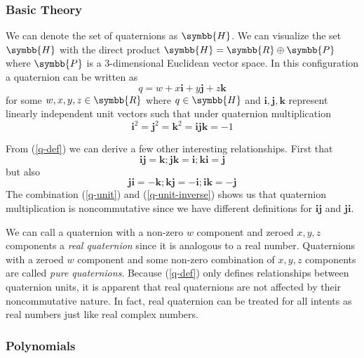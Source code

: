 \documentclass[11pt,hidelinks]{article}
\numberwithin{equation}{section} %
\theoremstyle{bf}
\theoremstyle{indentbf}
\begin{document}
\subsubsection{Basic Theory}
\label{sec:org50cc40b}

We can denote the set of quaternions as \(\symbb{H}\). We can visualize the set \(\symbb{H}\) with the direct product \(\symbb{H} = \symbb{R} \oplus \symbb{P}\) where \(\symbb{P}\) is a 3-dimensional Euclidean vector space. In this configuration a quaternion can be written as
\begin{equation}
    q = w + x\symbf{i} + y\symbf{j} + z\symbf{k}
\end{equation}
for some \(w,x,y,z \in \symbb{R}\) where \(q \in \symbb{H}\) and \(\symbf{i},\symbf{j},\symbf{k}\) represent linearly independent unit vectors such that under quaternion multiplication
\begin{equation}
\label{q-def}
    \symbf{i}^2 = \symbf{j}^2 = \symbf{k}^2 = \symbf{ijk} = -1
\end{equation}

From (\ref{q-def}) we can derive a few other interesting relationships. First that
\begin{equation}
\label{q-unit}
    \symbf{ij} = \symbf{k}; \symbf{jk} = \symbf{i}; \symbf{ki} = \symbf{j}
\end{equation}
but also
\begin{equation}
\label{q-unit-inverse}
    \symbf{ji} = -\symbf{k}; \symbf{kj} = -\symbf{i}; \symbf{ik} = -\symbf{j}
\end{equation}
The combination (\ref{q-unit}) and (\ref{q-unit-inverse}) shows us that quaternion multiplication is noncommutative since we have different definitions for \(\symbf{ij}\) and \(\symbf{ji}\).

We can call a quaternion with a non-zero \(w\) component and zeroed \(x,y,z\) components a \emph{real quaternion} since it is analogous to a real number. Quaternions with a zeroed \(w\) component and some non-zero combination of \(x,y,z\) components are called \emph{pure quaternions}. Because (\ref{q-def}) only defines relationships between quaternion units, it is apparent that real quaternions are not affected by their noncommutative nature. In fact, real quaternion can be treated for all intents as real numbers just like real complex numbers.

\subsubsection{Polynomials}
\label{sec:org6b82017}
\end{document}

